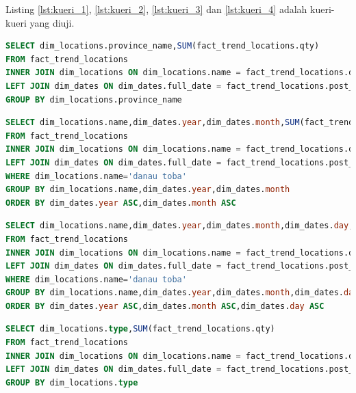 Listing \ref{lst:kueri_1}, \ref{lst:kueri_2}, \ref{lst:kueri_3} dan \ref{lst:kueri_4} adalah kueri-kueri yang diuji.

\begin{lstlisting}[language=SQL,basicstyle=\tiny,caption=Mencari tren wisata per provinsi,label={lst:kueri_1}]
SELECT dim_locations.province_name,SUM(fact_trend_locations.qty) 
FROM fact_trend_locations 
INNER JOIN dim_locations ON dim_locations.name = fact_trend_locations.destination 
LEFT JOIN dim_dates ON dim_dates.full_date = fact_trend_locations.post_date  
GROUP BY dim_locations.province_name 
\end{lstlisting}

\begin{lstlisting}[language=SQL,basicstyle=\tiny,caption=Mencari tren suatu lokasi wisata dari bulan ke bulan,label={lst:kueri_2}]
SELECT dim_locations.name,dim_dates.year,dim_dates.month,SUM(fact_trend_locations.qty) 
FROM fact_trend_locations 
INNER JOIN dim_locations ON dim_locations.name = fact_trend_locations.destination 
LEFT JOIN dim_dates ON dim_dates.full_date = fact_trend_locations.post_date  
WHERE dim_locations.name='danau toba' 
GROUP BY dim_locations.name,dim_dates.year,dim_dates.month 
ORDER BY dim_dates.year ASC,dim_dates.month ASC 
\end{lstlisting}

\begin{lstlisting}[language=SQL,basicstyle=\tiny,caption=Mencari tren suatu lokasi wisata dari hari ke hari,label={lst:kueri_3}]
SELECT dim_locations.name,dim_dates.year,dim_dates.month,dim_dates.day,SUM(fact_trend_locations.qty) 
FROM fact_trend_locations 
INNER JOIN dim_locations ON dim_locations.name = fact_trend_locations.destination 
LEFT JOIN dim_dates ON dim_dates.full_date = fact_trend_locations.post_date  
WHERE dim_locations.name='danau toba' 
GROUP BY dim_locations.name,dim_dates.year,dim_dates.month,dim_dates.day 
ORDER BY dim_dates.year ASC,dim_dates.month ASC,dim_dates.day ASC 
\end{lstlisting}

\begin{lstlisting}[language=SQL,basicstyle=\tiny,caption=Mencari tren tipe lokasi wisata,label={lst:kueri_4}]
SELECT dim_locations.type,SUM(fact_trend_locations.qty) 
FROM fact_trend_locations 
INNER JOIN dim_locations ON dim_locations.name = fact_trend_locations.destination 
LEFT JOIN dim_dates ON dim_dates.full_date = fact_trend_locations.post_date  
GROUP BY dim_locations.type 
\end{lstlisting}

